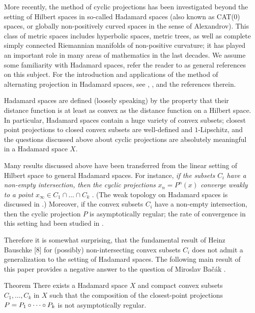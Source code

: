 \documentclass[a4paper,10pt]{article}
\begin{document}
More recently, the method of cyclic  projections has been investigated beyond the setting of Hilbert spaces in so-called Hadamard spaces (also known as CAT(0) spaces, or globally non-positively curved spaces in the sense of Alexandrov).
This class of metric spaces includes hyperbolic spaces, metric trees, as well as complete simply connected Riemannian manifolds of non-positive curvature;
it has played an important role in many areas of mathematics  in the last decades.
We assume some familiarity with Hadamard spaces, refer the reader to \cite{BBI,BH,AKP,AKP_inv} as general references on this subject.
For the introduction and applications of the method of alternating projection in Hadamard spaces,
see \cite{bachak-book}, \cite[Section 6.8]{Bac}, and the references therein.

Hadamard spaces are defined (loosely speaking) by the property that their distance function is at least as convex as the distance function on a Hilbert space.
In particular, Hadamard spaces contain a huge variety of convex subsets;
closest point projections to closed convex subsets are well-defined and $1$-Lipschitz,
and the questions discussed above about cyclic projections are absolutely meaningful in a Hadamard space $X$.

Many results discussed above have been transferred from the linear setting of Hilbert space
to general Hadamard spaces.
For instance, \emph{if the subsets $C_i$ have a non-empty intersection, then 
the cyclic projections $x_n=P^n (x)$ converge \emph{weakly} to a point $x_{\infty} \in C_1\cap \dots\cap C_k$}
\cite{asymptotic, Bac2}.
(The weak topology on Hadamard spaces is discussed in \cite{Bac, bachak-book, lytchak-petrunin}.)
Moreover, if the convex subsets $C_i$ have a non-empty intersection, then the cyclic projection $P$ is asymptotically regular;
the rate of convergence in this setting had been studied in \cite{KLN}.

Therefore it is somewhat surprising, that the fundamental result of Heinz Bauschke [8] for (possibly) non-intersecting convex subsets $C_i$ does not admit  a generalization to the
 setting of Hadamard spaces.  The following main result of this paper provides a negative answer to  the question of Miroslav Bačák \cite[Problem 6.13]{Bac}.

\begin{thm}{Theorem}\label{thm}
There exists a Hadamard space $X$ and compact convex subsets $C_1,\dots,C_k$ in $X$ such that the composition of the closest-point projections $P\z= P_1\circ \dots \circ P_k$ is not asymptotically regular.
\end{thm}
\end{document}

